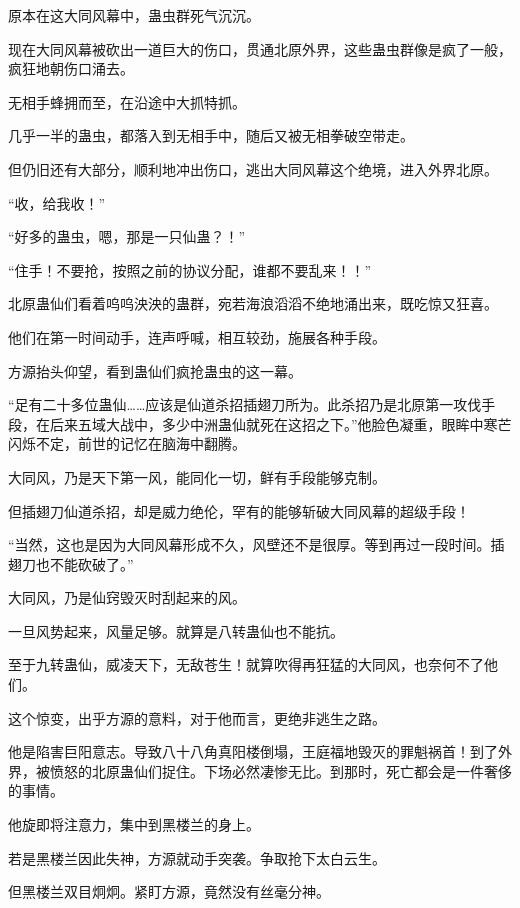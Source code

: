 
\begin{this_body}

原本在这大同风幕中，蛊虫群死气沉沉。

现在大同风幕被砍出一道巨大的伤口，贯通北原外界，这些蛊虫群像是疯了一般，疯狂地朝伤口涌去。

无相手蜂拥而至，在沿途中大抓特抓。

几乎一半的蛊虫，都落入到无相手中，随后又被无相拳破空带走。

但仍旧还有大部分，顺利地冲出伤口，逃出大同风幕这个绝境，进入外界北原。

“收，给我收！”

“好多的蛊虫，嗯，那是一只仙蛊？！”

“住手！不要抢，按照之前的协议分配，谁都不要乱来！！”

北原蛊仙们看着呜呜泱泱的蛊群，宛若海浪滔滔不绝地涌出来，既吃惊又狂喜。

他们在第一时间动手，连声呼喊，相互较劲，施展各种手段。

方源抬头仰望，看到蛊仙们疯抢蛊虫的这一幕。

“足有二十多位蛊仙……应该是仙道杀招插翅刀所为。此杀招乃是北原第一攻伐手段，在后来五域大战中，多少中洲蛊仙就死在这招之下。”他脸色凝重，眼眸中寒芒闪烁不定，前世的记忆在脑海中翻腾。

大同风，乃是天下第一风，能同化一切，鲜有手段能够克制。

但插翅刀仙道杀招，却是威力绝伦，罕有的能够斩破大同风幕的超级手段！

“当然，这也是因为大同风幕形成不久，风壁还不是很厚。等到再过一段时间。插翅刀也不能砍破了。”

大同风，乃是仙窍毁灭时刮起来的风。

一旦风势起来，风量足够。就算是八转蛊仙也不能抗。

至于九转蛊仙，威凌天下，无敌苍生！就算吹得再狂猛的大同风，也奈何不了他们。

这个惊变，出乎方源的意料，对于他而言，更绝非逃生之路。

他是陷害巨阳意志。导致八十八角真阳楼倒塌，王庭福地毁灭的罪魁祸首！到了外界，被愤怒的北原蛊仙们捉住。下场必然凄惨无比。到那时，死亡都会是一件奢侈的事情。

他旋即将注意力，集中到黑楼兰的身上。

若是黑楼兰因此失神，方源就动手突袭。争取抢下太白云生。

但黑楼兰双目炯炯。紧盯方源，竟然没有丝毫分神。


\end{this_body}
